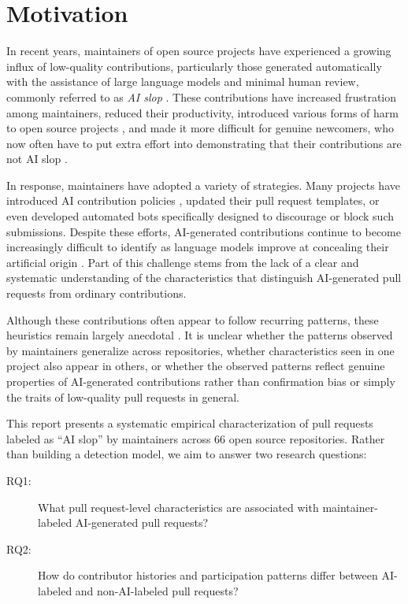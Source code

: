 \documentclass[11pt]{article}
\begin{document}
	\section{Motivation}
	In recent years, maintainers of open source projects have experienced a growing influx of low-quality contributions, particularly those generated automatically with the assistance of large language models and minimal human review, commonly referred to as \emph{AI slop} \cite{baltes2026anendlessstreamai}. These contributions have increased frustration among maintainers, reduced their productivity, introduced various forms of harm to open source projects \cite{ gao2026autopilotempiricalstudyhumanai, watanabe2025use}, and made it more difficult for genuine newcomers, who now often have to put extra effort into demonstrating that their contributions are not AI slop \cite{ zhang2026augmentationdilutionlargescaleempirical}.
	
	In response, maintainers have adopted a variety of strategies. Many projects have introduced AI contribution policies \cite{hora2026aipolicydisclosurehuman}, updated their pull request templates, or even developed automated bots specifically designed to discourage or block such submissions. Despite these efforts, AI-generated contributions continue to become increasingly difficult to identify as language models improve at concealing their artificial origin \cite{ogenrwot2026patchtrackcomprehensiveanalysischatgpts, ogenrwot2026ai, hasan2026quietcontributionsinsightsaigenerated}. Part of this challenge stems from the lack of a clear and systematic understanding of the characteristics that distinguish AI-generated pull requests from ordinary contributions.
	
	Although these contributions often appear to follow recurring patterns, these heuristics remain largely anecdotal \cite{yoshioka2026letsmakepullrequest}. It is unclear whether the patterns observed by maintainers generalize across repositories, whether characteristics seen in one project also appear in others, or whether the observed patterns reflect genuine properties of AI-generated contributions rather than confirmation bias or simply the traits of low-quality pull requests in general.
	
	This report presents a systematic empirical characterization of pull requests labeled as ``AI slop'' by maintainers across 66 open source repositories. Rather than building a detection model, we aim to answer two research questions:
	
	\begin{description}
		\item[RQ1:] What pull request-level characteristics are associated with maintainer-labeled AI-generated pull requests?
		\item[RQ2:] How do contributor histories and participation patterns differ between AI-labeled and non-AI-labeled pull requests?
	\end{description}
	
\end{document}
